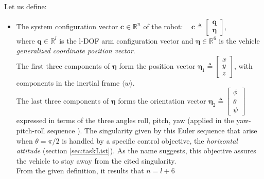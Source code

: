 \noindent Let us define:
\begin{itemize}
	\item The system configuration vector $ \boldsymbol{c} \in \mathbb{R}^{n}$ of the robot: ~
	$\boldsymbol{c} \triangleq 
		\begin{bmatrix}
			{\boldsymbol{q}} \\ \boldsymbol{\eta}
		\end{bmatrix}$,\\
	where $\boldsymbol{q} \in \mathbb{R}^{l}$ is the l-DOF arm configuration vector and  $\boldsymbol{\eta} \in \mathbb{R}^6$ is the vehicle \emph{generalized coordinate position vector}.\\
	The first three components of $\boldsymbol{\eta}$ form the position vector $\boldsymbol{\eta}_1 \triangleq \begin{bmatrix}x \\ y \\ z\end{bmatrix}$, with components in the inertial frame $\langle w \rangle$.\\
	The last three components of $\boldsymbol{\eta}$ forms the orientation vector $\boldsymbol{\eta}_2 \triangleq \begin{bmatrix}\phi \\ \theta \\ \psi\end{bmatrix}$ expressed in terms of the three angles roll, pitch, yaw (applied in the yaw-pitch-roll sequence \cite{fossenAnglesSeq}). The singularity given by this Euler sequence that arise when $ \theta = \pi/2$ is handled by a specific control objective, the \textit{horizontal attitude} (section \ref{sec:taskList}). As the name suggests, this objective assures the vehicle to stay away from the cited singularity.\\
	From the given definition, it results that $ n = l+6 $
	

\end{itemize}
